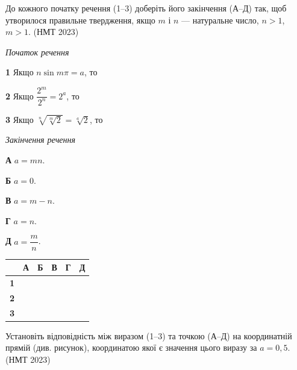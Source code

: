 \documentclass[14pt]{extarticle}
\newcommand{\matchTable}{
\begin{tabular}{|>{\centering\arraybackslash}p{0.2cm}|*{5}{>{\centering\arraybackslash}p{0.2cm}|}}
\hline
& \textbf{А} & \textbf{Б} & \textbf{В} & \textbf{Г} & \textbf{Д} \\
\hline
\textbf{1} & \rule{0pt}{0.2cm} & & & & \\
\hline
\textbf{2} & \rule{0pt}{0.2cm} & & & & \\
\hline
\textbf{3} & \rule{0pt}{0.2cm} & & & & \\
\hline
\end{tabular}
}
\newcommand{\task}[2]{\noindent\makebox[1.5em][l]{\textbf{#1.}}\parbox[t]{\dimexpr\textwidth-1.5em}{#2}}
\newcommand{\nmtyear}[1]{\hfill{\small\color{yearcolor}(НМТ #1)}}
\begin{document}
\vspace{0.7cm}

\task{4}{До кожного початку речення (1--3) доберіть його закінчення (А--Д) так, щоб утворилося правильне твердження, якщо $m$ і $n$ --- натуральне число, $n > 1$, $m > 1$. \nmtyear{2023}}

\vspace{0.3cm}
\begin{minipage}{0.45\textwidth}
\textit{Початок речення}

\vspace{0.2cm}
\textbf{1} \quad Якщо $n \sin m\pi = a$, то

\vspace{0.2cm}
\textbf{2} \quad Якщо $\dfrac{2^m}{2^n} = 2^a$, то

\vspace{0.2cm}
\textbf{3} \quad Якщо $\sqrt[n]{\sqrt[m]{2}} = \sqrt[a]{2}$, то
\end{minipage}
\hfill
\begin{minipage}{0.28\textwidth}
\textit{Закінчення речення}

\vspace{0.2cm}
\textbf{А} \quad $a = mn$.

\vspace{0.2cm}
\textbf{Б} \quad $a = 0$.

\vspace{0.2cm}
\textbf{В} \quad $a = m - n$.

\vspace{0.2cm}
\textbf{Г} \quad $a = n$.

\vspace{0.2cm}
\textbf{Д} \quad $a = \dfrac{m}{n}$.
\end{minipage}
\hfill
\begin{minipage}{0.2\textwidth}
\matchTable
\end{minipage}

\vspace{0.7cm}

\task{5}{Установіть відповідність між виразом (1--3) та точкою (А--Д) на координатній прямій (див. рисунок), координатою якої є значення цього виразу за $a = 0{,}5$. \nmtyear{2023}}

\vspace{0.3cm}
\begin{center}
\end{center}
\end{document}
